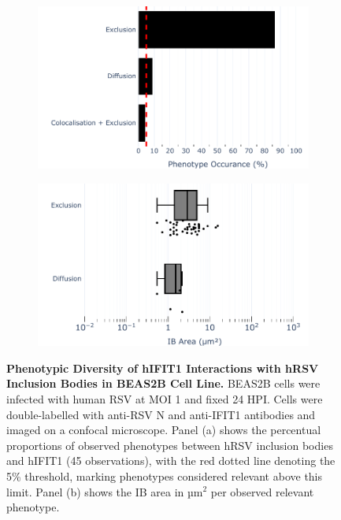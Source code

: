 \begin{figure}
    \begin{subfigure}{0.495\textwidth}
        \caption{}
        \includegraphics[width=1\linewidth]{08. Chapter 3/Figs/02. Infection/01. IFIT1/04. bar_i1_beas2b.pdf} 
    \end{subfigure}
    \begin{subfigure}{0.495\textwidth}
        \caption{}
        \includegraphics[width=1\linewidth]{08. Chapter 3/Figs/02. Infection/01. IFIT1/05. box_i1_beas2b.pdf}
    \end{subfigure}
    \caption[Phenotypic Diversity of hIFIT1 Interactions with hRSV Inclusion Bodies in BEAS2B Cell Line.]{\textbf{Phenotypic Diversity of hIFIT1 Interactions with hRSV Inclusion Bodies in BEAS2B Cell Line.} BEAS2B cells were infected with human RSV at MOI 1 and fixed 24 HPI. Cells were double-labelled with anti-RSV N and anti-IFIT1 antibodies and imaged on a confocal microscope. Panel (a) shows the percentual proportions of observed phenotypes between hRSV inclusion bodies and hIFIT1 (45 observations), with the red dotted line denoting the 5\% threshold, marking phenotypes considered relevant above this limit. Panel (b) shows the IB area in \(\mbox{µm}^2\) per observed relevant phenotype.}
    \label{fig:Phenotypic Diversity of hIFIT1 Interactions with hRSV Inclusion Bodies in BEAS2B Cell Line}
\end{figure}

